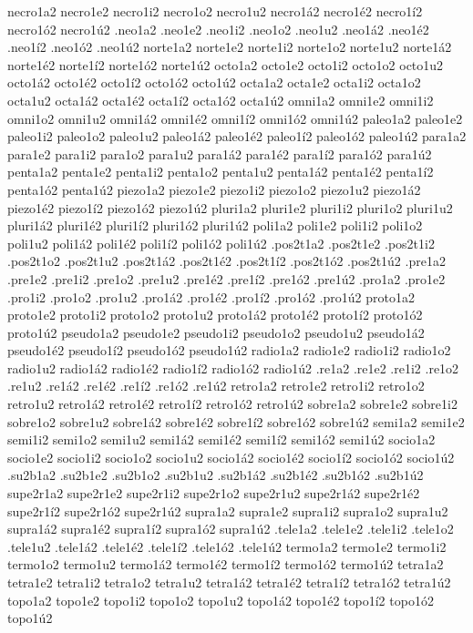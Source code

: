 {necro1a2 necro1e2 necro1i2 necro1o2 necro1u2 necro1á2 necro1é2 necro1í2 necro1ó2 necro1ú2
.neo1a2 .neo1e2 .neo1i2 .neo1o2 .neo1u2 .neo1á2 .neo1é2 .neo1í2 .neo1ó2 .neo1ú2
norte1a2 norte1e2 norte1i2 norte1o2 norte1u2 norte1á2 norte1é2 norte1í2 norte1ó2 norte1ú2
octo1a2 octo1e2 octo1i2 octo1o2 octo1u2 octo1á2 octo1é2 octo1í2 octo1ó2 octo1ú2
octa1a2 octa1e2 octa1i2 octa1o2 octa1u2 octa1á2 octa1é2 octa1í2 octa1ó2 octa1ú2
omni1a2 omni1e2 omni1i2 omni1o2 omni1u2 omni1á2 omni1é2 omni1í2 omni1ó2 omni1ú2
paleo1a2 paleo1e2 paleo1i2 paleo1o2 paleo1u2 paleo1á2 paleo1é2 paleo1í2 paleo1ó2 paleo1ú2
para1a2 para1e2 para1i2 para1o2 para1u2 para1á2 para1é2 para1í2 para1ó2 para1ú2
penta1a2 penta1e2 penta1i2 penta1o2 penta1u2 penta1á2 penta1é2 penta1í2 penta1ó2 penta1ú2
piezo1a2 piezo1e2 piezo1i2 piezo1o2 piezo1u2 piezo1á2 piezo1é2 piezo1í2 piezo1ó2 piezo1ú2
pluri1a2 pluri1e2 pluri1i2 pluri1o2 pluri1u2 pluri1á2 pluri1é2 pluri1í2 pluri1ó2 pluri1ú2
poli1a2 poli1e2 poli1i2 poli1o2 poli1u2 poli1á2 poli1é2 poli1í2 poli1ó2 poli1ú2
.pos2t1a2 .pos2t1e2 .pos2t1i2 .pos2t1o2 .pos2t1u2 .pos2t1á2 .pos2t1é2 .pos2t1í2 .pos2t1ó2 .pos2t1ú2
.pre1a2 .pre1e2 .pre1i2 .pre1o2 .pre1u2          .pre1é2 .pre1í2 .pre1ó2 .pre1ú2
.pro1a2 .pro1e2 .pro1i2 .pro1o2 .pro1u2 .pro1á2 .pro1é2 .pro1í2 .pro1ó2 .pro1ú2
proto1a2 proto1e2 proto1i2 proto1o2 proto1u2 proto1á2 proto1é2 proto1í2 proto1ó2 proto1ú2
pseudo1a2 pseudo1e2 pseudo1i2 pseudo1o2 pseudo1u2 pseudo1á2 pseudo1é2 pseudo1í2 pseudo1ó2 pseudo1ú2
radio1a2 radio1e2 radio1i2 radio1o2 radio1u2 radio1á2 radio1é2 radio1í2 radio1ó2 radio1ú2
.re1a2 .re1e2 .re1i2 .re1o2 .re1u2 .re1á2 .re1é2 .re1í2 .re1ó2 .re1ú2
retro1a2 retro1e2 retro1i2 retro1o2 retro1u2 retro1á2 retro1é2 retro1í2 retro1ó2 retro1ú2
sobre1a2 sobre1e2 sobre1i2 sobre1o2 sobre1u2 sobre1á2 sobre1é2 sobre1í2 sobre1ó2 sobre1ú2
semi1a2 semi1e2 semi1i2 semi1o2 semi1u2 semi1á2 semi1é2 semi1í2 semi1ó2 semi1ú2
socio1a2 socio1e2 socio1i2 socio1o2 socio1u2 socio1á2 socio1é2 socio1í2 socio1ó2 socio1ú2
.su2b1a2 .su2b1e2          .su2b1o2 .su2b1u2 .su2b1á2 .su2b1é2           .su2b1ó2 .su2b1ú2
supe2r1a2 supe2r1e2 supe2r1i2 supe2r1o2 supe2r1u2 supe2r1á2 supe2r1é2 supe2r1í2 supe2r1ó2 supe2r1ú2
supra1a2 supra1e2 supra1i2 supra1o2 supra1u2 supra1á2 supra1é2 supra1í2 supra1ó2 supra1ú2
.tele1a2 .tele1e2 .tele1i2 .tele1o2 .tele1u2 .tele1á2 .tele1é2 .tele1í2 .tele1ó2 .tele1ú2
termo1a2 termo1e2 termo1i2 termo1o2 termo1u2 termo1á2 termo1é2 termo1í2 termo1ó2 termo1ú2
tetra1a2 tetra1e2 tetra1i2 tetra1o2 tetra1u2 tetra1á2 tetra1é2 tetra1í2 tetra1ó2 tetra1ú2
topo1a2 topo1e2 topo1i2 topo1o2 topo1u2 topo1á2 topo1é2 topo1í2 topo1ó2 topo1ú2
}
